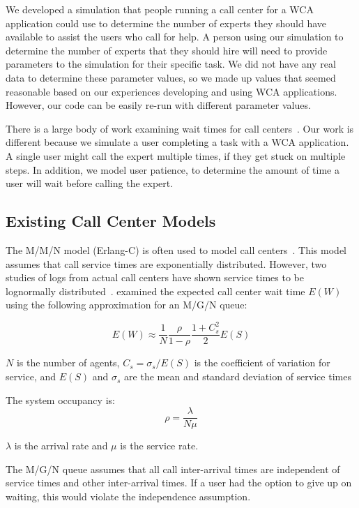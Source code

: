 We developed a simulation that people running a call center for a WCA
application could use to determine the number of experts they should have
available to assist the users who call for help.
A person using our simulation to determine the number of experts that they
should hire will need to provide parameters to the simulation for their specific
task.
We did not have any real data to determine these parameter values, so we made up
values that seemed reasonable based on our experiences developing and using WCA
applications.
However, our code can be easily re-run with different parameter values.

There is a large body of work examining wait times for call
centers~\cite{queue1, queue2}.
Our work is different because we simulate a user completing a task with a WCA
application.
A single user might call the expert multiple times, if they get stuck on
multiple steps.
In addition, we model user patience, to determine the amount of time a user will
wait before calling the expert.

\subsection{Existing Call Center Models}

The M/M/N model (Erlang-C) is often used to model call centers~\cite{queue1}.
This model assumes that call service times are exponentially distributed.
However, two studies of logs from actual call centers have shown service times
to be lognormally distributed~\cite{queue1, queue2}.
\citet{queue1} examined the expected call center wait time $E(W)$ using the
following approximation for an M/G/N queue:

\begin{equation}
  E(W) \approx \frac{1}{N} \frac{\rho}{1 - \rho} \frac{1 + C_s^2}{2} E(S)
\label{eq:wait}
\end{equation}

$N$ is the number of agents,
$C_s = \sigma_s / E(S)$ is the coefficient of variation for service, and
$E(S)$ and $\sigma_s$ are the mean and standard deviation of service times

The system occupancy is:
\begin{equation}
\rho = \frac{\lambda}{N \mu}
\label{eq:occupancy}
\end{equation}

$\lambda$ is the arrival rate and $\mu$ is the service rate.

The M/G/N queue assumes that all call inter-arrival times are independent of
service times and other inter-arrival times.
If a user had the option to give up on waiting, this would violate the
independence assumption.


